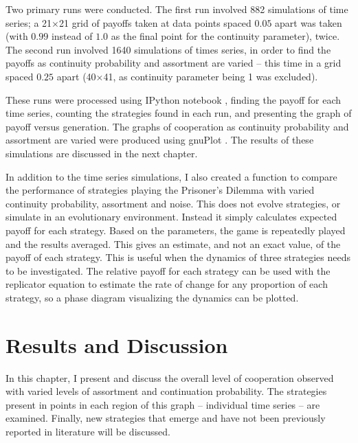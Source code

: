 \documentclass[a4paper,11pt,bcshonoursthesis,singlespace,oneside,thesisdraft,pdflatex]{cssethesis}
\begin{document}
Two primary runs were conducted. 
The first run involved 882 simulations of time series; a 21$\times$21 grid of payoffs taken at data points spaced $0.05$ apart was taken (with $0.99$ instead of $1.0$ as the final point for the continuity parameter), twice. 
The second run involved 1640 simulations of times series, in order to find the payoffs as continuity probability and assortment are varied -- this time in a grid spaced $0.25$ apart (40$\times$41, as continuity parameter being 1 was excluded). 

These runs were processed using IPython notebook \citep{PER-GRA:2007}, finding the payoff for each time series, counting the strategies found in each run, and presenting the graph of payoff versus generation. 
The graphs of cooperation as continuity probability and assortment are varied were produced using gnuPlot \citep{Gnuplot_4.4}. 
The results of these simulations are discussed in the next chapter.

In addition to the time series simulations, I also created a function to compare the performance of strategies playing the Prisoner's Dilemma with varied continuity probability, assortment and noise. 
This does not evolve strategies, or simulate in an evolutionary environment. 
Instead it simply calculates expected payoff for each strategy. 
Based on the parameters, the game is repeatedly played and the results averaged. 
This gives an estimate, and not an exact value, of the payoff of each strategy. 
This is useful when the dynamics of three strategies needs to be investigated. 
The relative payoff for each strategy can be used with the replicator equation to estimate the rate of change for any proportion of each strategy, so a phase diagram visualizing the dynamics can be plotted. 

\chapter{Results and Discussion}
\label{chap:results}
In this chapter, I present and discuss the overall level of cooperation observed with varied levels of assortment and continuation probability.  
The strategies present in points in each region of this graph -- individual time series -- are examined. Finally, new strategies that emerge and have not been previously reported in literature will be discussed. 
\end{document}
